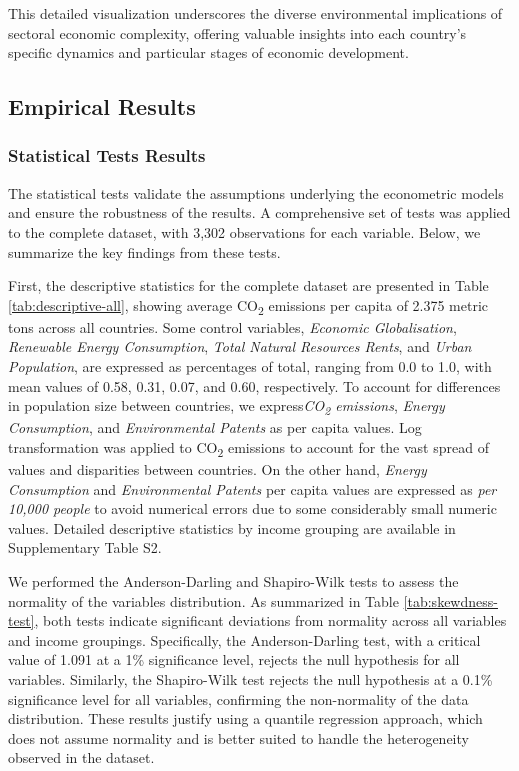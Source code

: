 \documentclass[10pt]{article}
\begin{document}
This detailed visualization underscores the diverse environmental implications of sectoral economic complexity, offering valuable insights into each country's specific dynamics and particular stages of economic development.


\subsection{Empirical Results}
\subsubsection{Statistical Tests Results}
The statistical tests validate the assumptions underlying the econometric models and ensure the robustness of the results. A comprehensive set of tests was applied to the complete dataset, with 3,302 observations for each variable. Below, we summarize the key findings from these tests.

First, the descriptive statistics for the complete dataset are presented in Table \ref{tab:descriptive-all}, showing average CO\textsubscript{2} emissions per capita of 2.375 metric tons across all countries. Some control variables, \textit{Economic Globalisation}, \textit{Renewable Energy Consumption}, \textit{Total Natural Resources Rents}, and \textit{Urban Population}, are expressed as percentages of total, ranging from 0.0 to 1.0, with mean values of 0.58, 0.31, 0.07, and 0.60, respectively. To account for differences in population size between countries, we express\textit{CO\textsubscript{2} emissions}, \textit{Energy Consumption}, and \textit{Environmental Patents} as per capita values. Log transformation was applied to CO\textsubscript{2} emissions to account for the vast spread of values and disparities between countries. On the other hand, \textit{Energy Consumption} and \textit{Environmental Patents} per capita values are expressed as \textit{per 10,000 people} to avoid numerical errors due to some considerably small numeric values. Detailed descriptive statistics by income grouping are available in Supplementary Table S2.

We performed the Anderson-Darling and Shapiro-Wilk tests to assess the normality of the variables distribution. As summarized in Table \ref{tab:skewdness-test}, both tests indicate significant deviations from normality across all variables and income groupings. Specifically, the Anderson-Darling test, with a critical value of 1.091 at a 1\% significance level, rejects the null hypothesis for all variables. Similarly, the Shapiro-Wilk test rejects the null hypothesis at a 0.1\% significance level for all variables, confirming the non-normality of the data distribution. These results justify using a quantile regression approach, which does not assume normality and is better suited to handle the heterogeneity observed in the dataset.
\end{document}

